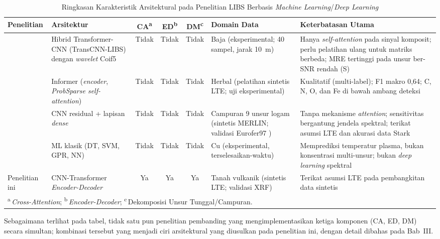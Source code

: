 \begin{table}[htbp]
\centering
\caption{Ringkasan Karakteristik Arsitektural pada Penelitian LIBS Berbasis \textit{Machine Learning}/\textit{Deep Learning}}
\label{tab:perbandingan_penelitian}
\footnotesize
\begin{tabular}{|p{2.1cm}|p{2.2cm}|c|c|c|p{2.1cm}|p{3.1cm}|}
\hline
Penelitian & Arsitektur & CA\textsuperscript{a} & ED\textsuperscript{b} & DM\textsuperscript{c} & Domain Data & Keterbatasan Utama \\
\hline
\citet{liu_remote_2026} & Hibrid Transformer-CNN (TransCNN-LIBS) dengan \textit{wavelet} Coif5 & Tidak & Tidak & Tidak & Baja (eksperimental; 40 sampel, jarak 10~m) & Hanya \textit{self-attention} pada sinyal komposit; perlu pelatihan ulang untuk matriks berbeda; MRE tertinggi pada unsur ber-SNR rendah (S) \\
\hline
\citet{walidain_informer-based_2026} & Informer (\textit{encoder}, \textit{ProbSparse self-attention}) & Tidak & Tidak & Tidak & Herbal (pelatihan sintetis LTE; uji eksperimental) & Kualitatif (multi-label); F1 makro 0,64; C, N, O, dan Fe di bawah ambang deteksi \\
\hline
\citet{favre_towards_2025} & CNN residual + lapisan \textit{dense} & Tidak & Tidak & Tidak & Campuran 9 unsur logam (sintetis MERLIN; validasi Eurofer97 \citep{favre_merlin_2025}) & Tanpa mekanisme \textit{attention}; sensitivitas bergantung jendela spektral; terikat asumsi LTE dan akurasi data Stark \\
\hline
\citet{wang_simulation_2024} & ML klasik (DT, SVM, GPR, NN) & Tidak & Tidak & Tidak & Cu (eksperimental, terselesaikan-waktu) & Memprediksi temperatur plasma, bukan konsentrasi multi-unsur; bukan \textit{deep learning} spektral \\
\hline
Penelitian ini & CNN-Transformer \textit{Encoder-Decoder} & Ya & Ya & Ya & Tanah vulkanik (sintetis LTE; validasi XRF) & Terikat asumsi LTE pada pembangkitan data sintetis \\
\hline
\multicolumn{7}{l}{\textsuperscript{a}\,\textit{Cross-Attention}; \textsuperscript{b}\,\textit{Encoder-Decoder}; \textsuperscript{c}\,Dekomposisi Unsur Tunggal/Campuran.}
\end{tabular}
\end{table}

Sebagaimana terlihat pada tabel, tidak satu pun penelitian pembanding yang mengimplementasikan ketiga komponen (CA, ED, DM) secara simultan; kombinasi tersebut yang menjadi ciri arsitektural yang diusulkan pada penelitian ini, dengan detail dibahas pada Bab~III.

